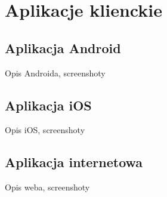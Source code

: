 \chapter{Aplikacje klienckie}

\section*{Aplikacja Android}

Opis Androida, screenshoty


\section*{Aplikacja iOS}

Opis iOS, screenshoty


\section*{Aplikacja internetowa}

Opis weba, screenshoty